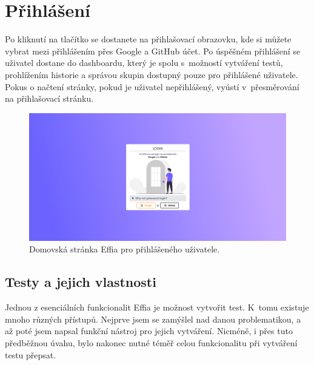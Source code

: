 \documentclass[12pt, a4paper,
openright
]{report}
\begin{document}

\section{Přihlášení}
Po kliknutí na tlačítko  se dostanete na přihlašovací obrazovku, kde si můžete vybrat mezi přihlášením přes Google a GitHub účet. Po úspěšném přihlášení se uživatel dostane do dashboardu, který je spolu s~možností vytváření testů, prohlížením historie a správou skupin dostupný pouze pro přihlášené uživatele. Pokus o načtení stránky, pokud je uživatel nepřihlášený, vyústí v~přesměrování na přihlašovací stránku.

\begin{figure}[h]
	\centering %
	\includegraphics[width=1\linewidth]{image/login.png} 
	\caption{Domovská stránka Effia pro přihlášeného uživatele.} %
	\label{fig:homepage-loggedin} %
\end{figure}

\subsection{Testy a jejich vlastnosti}
Jednou z esenciálních funkcionalit Effia je možnost vytvořit test. K~tomu existuje mnoho různých přístupů. Nejprve jsem se zamýšlel nad danou problematikou, a až poté jsem napsal funkční nástroj pro jejich vytváření. Nicméně, i přes tuto předběžnou úvahu, bylo nakonec nutné téměř celou funkcionalitu při vytváření testu přepsat.
\end{document}
